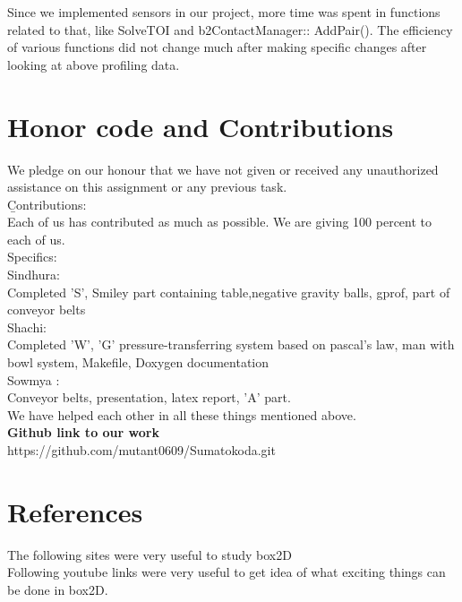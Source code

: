 \documentclass{report}
\begin{document}
Since we implemented sensors in our project, more time was spent in functions related to that, like SolveTOI and b2ContactManager:: AddPair().
The efficiency of various functions did not change much after making specific changes after looking at above profiling data. 
\newpage
\section{Honor code and Contributions}
We pledge on our honour that we have not given or received any unauthorized assistance on this assignment or any previous task.\\

{\b Contributions}:\\
Each of us has contributed as much as possible. We are giving 100 percent to each of us.\\
Specifics:\\

Sindhura: \\
Completed 'S', Smiley part containing table,negative gravity balls, gprof, part of conveyor belts\\

Shachi:\\
Completed 'W', 'G' pressure-transferring system based on pascal's law, man with bowl system, Makefile, Doxygen documentation\\

Sowmya : \\
Conveyor belts, presentation, latex report, 'A' part.\\

We have helped each other in all these things mentioned above.\\
\textbf{Github link to our work}\\
https://github.com/mutant0609/Sumatokoda.git
\newpage
\section{References}

The following sites were very useful to study box2D
\cite{DUMMY:1}
\cite{DUMMY:2}\\
Following youtube links were very useful to get idea of what exciting things can be done in box2D.
\cite{DUMMY:3}
\cite{DUMMY:4}
\cite{DUMMY:5}
\cite{DUMMY:6}



\newpage

 

\end{document}
